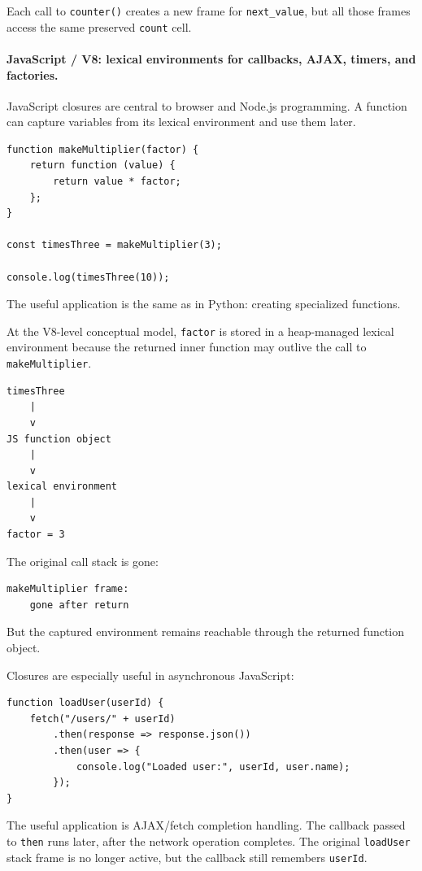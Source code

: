 Each call to \texttt{counter()} creates a new frame for \texttt{next\_value}, but all those frames access the same preserved \texttt{count} cell.

\paragraph{JavaScript / V8: lexical environments for callbacks, AJAX, timers, and factories.}

JavaScript closures are central to browser and Node.js programming. A function can capture variables from its lexical environment and use them later.

\begin{verbatim}
function makeMultiplier(factor) {
    return function (value) {
        return value * factor;
    };
}

const timesThree = makeMultiplier(3);

console.log(timesThree(10));
\end{verbatim}

The useful application is the same as in Python: creating specialized functions.

At the V8-level conceptual model, \texttt{factor} is stored in a heap-managed lexical environment because the returned inner function may outlive the call to \texttt{makeMultiplier}.

\begin{verbatim}
timesThree
    |
    v
JS function object
    |
    v
lexical environment
    |
    v
factor = 3
\end{verbatim}

The original call stack is gone:

\begin{verbatim}
makeMultiplier frame:
    gone after return
\end{verbatim}

But the captured environment remains reachable through the returned function object.

Closures are especially useful in asynchronous JavaScript:

\begin{verbatim}
function loadUser(userId) {
    fetch("/users/" + userId)
        .then(response => response.json())
        .then(user => {
            console.log("Loaded user:", userId, user.name);
        });
}
\end{verbatim}

The useful application is AJAX/fetch completion handling. The callback passed to \texttt{then} runs later, after the network operation completes. The original \texttt{loadUser} stack frame is no longer active, but the callback still remembers \texttt{userId}.

